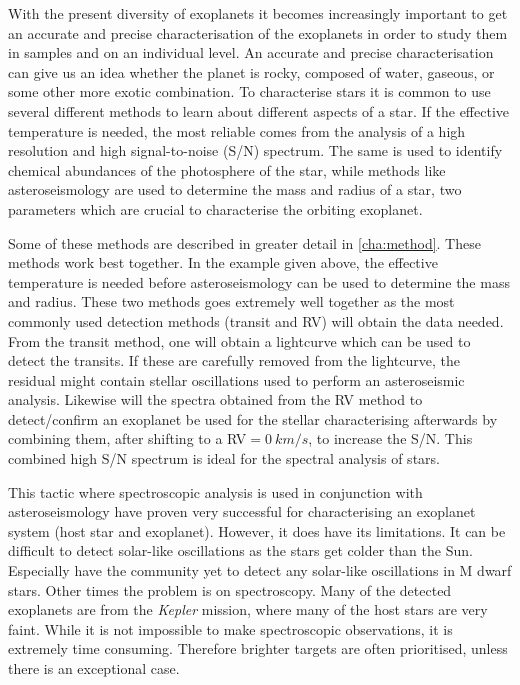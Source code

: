 With the present diversity of exoplanets it becomes increasingly important to get an accurate and
precise characterisation of the exoplanets in order to study them in samples and on an individual
level. An accurate and precise characterisation can give us an idea whether the planet is rocky,
composed of water, gaseous, or some other more exotic combination. To characterise stars it is
common to use several different methods to learn about different aspects of a star. If the effective
temperature is needed, the most reliable comes from the analysis of a high resolution and high
signal-to-noise (S/N) spectrum. The same is used to identify chemical abundances of the photosphere
of the star, while methods like asteroseismology are used to determine the mass and radius of a
star, two parameters which are crucial to characterise the orbiting exoplanet.

Some of these methods are described in greater detail in \cref{cha:method}. These methods work best
together. In the example given above, the effective temperature is needed before asteroseismology
can be used to determine the mass and radius. These two methods goes extremely well together as the
most commonly used detection methods (transit and RV) will obtain the data needed. From the transit
method, one will obtain a lightcurve which can be used to detect the transits. If these are
carefully removed from the lightcurve, the residual might contain stellar oscillations used to
perform an asteroseismic analysis. Likewise will the spectra obtained from the RV method to
detect/confirm an exoplanet be used for the stellar characterising afterwards by combining them,
after shifting to a RV$=\SI{0}{km/s}$, to increase the S/N. This combined high S/N spectrum is ideal
for the spectral analysis of stars.

This tactic where spectroscopic analysis is used in conjunction with asteroseismology have proven
very successful for characterising an exoplanet system (host star and
exoplanet). However, it does have its limitations. It can be difficult to detect solar-like
oscillations as the stars get colder than the Sun. Especially have the community yet to detect any
solar-like oscillations in M dwarf stars. Other times the problem is on
spectroscopy. Many of the detected exoplanets are from the \emph{Kepler} mission, where many of the
host stars are very faint. While it is not impossible to make spectroscopic observations, it is
extremely time consuming. Therefore brighter targets are often prioritised, unless there is an
exceptional case.

